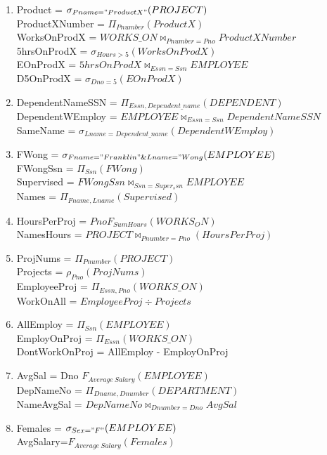 \documentclass[12pt]{article}
\newcounter{num}
\begin{document}
\begin{enumerate}
    \begin{enumerate}
        \item Product = $\sigma_{Pname="ProductX"} (PROJECT)$ \\
        ProductXNumber = $\Pi_{Pnumber}(ProductX)$ \\
        WorksOnProdX = $WORKS\_ON \bowtie_{Pnumber = Pno} ProductXNumber$ \\
        5hrsOnProdX = $\sigma_{Hours > 5}(WorksOnProdX)$ \\
        EOnProdX = $5hrsOnProdX \bowtie_{Essn = Ssn} EMPLOYEE$ \\
        D5OnProdX = $\sigma_{Dno = 5}(EOnProdX)$\\
        \item DependentNameSSN = $\Pi_{Essn, Dependent\_name}(DEPENDENT)$ \\
        DependentWEmploy = $EMPLOYEE \bowtie_{Essn = Ssn} DependentNameSSN$ \\
        SameName = $\sigma_{Lname = Dependent\_name}(DependentWEmploy)$
        \item FWong = $\sigma_{Fname = "Franklin" \& Lname = "Wong}(EMPLOYEE)$ \\
        FWongSsn = $\Pi_{Ssn}(FWong)$ \\
        Supervised = $FWongSsn \bowtie_{Ssn = Super_ssn}EMPLOYEE$ \\
        Names = $\Pi_{Fname, Lname}(Supervised)$ \\
        \item HoursPerProj = $Pno F_{Sum Hours}(WORKS_ON) $\\
        NamesHours = $PROJECT \bowtie_{Pnumber = Pno}(HoursPerProj)$
        \item ProjNums = $\Pi_{Pnumber}(PROJECT)$\\
        Projects = $\rho_{Pno}(ProjNums) $\\
        EmployeeProj = $\Pi_{Essn, Pno}(WORKS\_ON)$ \\
        WorkOnAll = $EmployeeProj \div Projects$ \\
        \item AllEmploy = $\Pi_{Ssn}(EMPLOYEE)$ \\
        EmployOnProj = $\Pi_{Essn}(WORKS\_ON)$ \\
        DontWorkOnProj = AllEmploy - EmployOnProj \\
        \item AvgSal = Dno $F_{Average\:Salary}(EMPLOYEE)$ \\
        DepNameNo = $\Pi_{Dname, Dnumber}(DEPARTMENT)$ \\
        NameAvgSal = $DepNameNo \bowtie_{Dnumber = Dno} AvgSal$ \\
        \item Females = $\sigma_{Sex="F"}(EMPLOYEE)$\\
        AvgSalary=$F_{Average\:Salary}(Females)$
    \end{enumerate}
\end{enumerate}
\newpage
\end{document}

